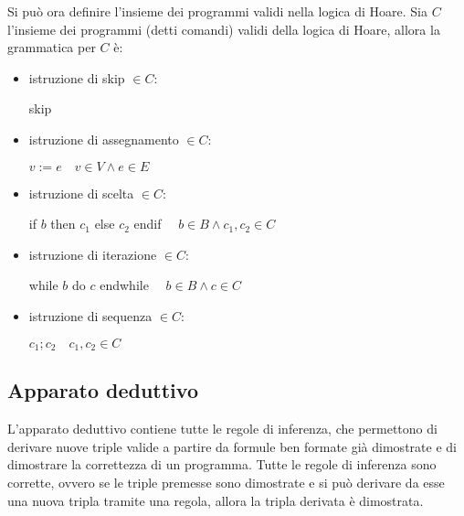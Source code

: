 Si può ora definire l'insieme dei programmi validi nella logica di Hoare.
Sia $C$ l'insieme dei programmi (detti comandi) validi della logica di Hoare,
allora la grammatica per $C$ è:
\begin{itemize}
    \item istruzione di skip $\in C$:
    \begin{center}
        skip
    \end{center}
    \item istruzione di assegnamento $\in C$:
    \begin{center}
        $v:=e \quad v \in V \land e \in E$
    \end{center}
    \item istruzione di scelta $\in C$:
    \begin{center}
        if $b$ then $c_1$ else $c_2$ endif $\quad b \in B \land c_1, c_2 \in C$
    \end{center}
    \item istruzione di iterazione $\in C$:
    \begin{center}
        while $b$ do $c$ endwhile $\quad b \in B \land c \in C$
    \end{center}
    \item istruzione di sequenza $\in C$:
    \begin{center}
        $c_1 ; c_2 \quad c_1, c_2 \in C$
    \end{center}
\end{itemize}

\subsection*{Apparato deduttivo}
L'apparato deduttivo contiene tutte le regole di inferenza, che permettono di
derivare nuove triple valide a partire da formule ben formate già dimostrate e di
dimostrare la correttezza di un programma.
Tutte le regole di inferenza sono corrette, ovvero se le triple
premesse sono dimostrate e si può derivare da esse una nuova tripla
tramite una regola, allora la tripla derivata è dimostrata.

